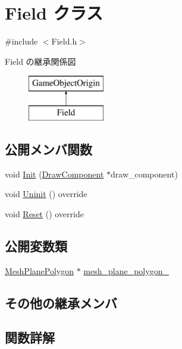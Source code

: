 \hypertarget{class_field}{}\section{Field クラス}
\label{class_field}


{\ttfamily \#include $<$Field.\+h$>$}

Field の継承関係図\begin{figure}[H]
\begin{center}
\leavevmode
\includegraphics[height=2.000000cm]{class_field}
\end{center}
\end{figure}
\subsection*{公開メンバ関数}
\begin{DoxyCompactItemize}
\item 
void \mbox{\hyperlink{class_field_a7d1f8e697d70550a416a595da78d07c7}{Init}} (\mbox{\hyperlink{class_draw_component}{Draw\+Component}} $\ast$draw\+\_\+component)
\item 
void \mbox{\hyperlink{class_field_a6d1015e2409daa87cd00485ac1efc06b}{Uninit}} () override
\item 
void \mbox{\hyperlink{class_field_a5b140074dcca821ac702da348238c6d4}{Reset}} () override
\end{DoxyCompactItemize}
\subsection*{公開変数類}
\begin{DoxyCompactItemize}
\item 
\mbox{\hyperlink{class_mesh_plane_polygon}{Mesh\+Plane\+Polygon}} $\ast$ \mbox{\hyperlink{class_field_a5c4ad4d2fea2269e7ab2185cf09beb10}{mesh\+\_\+plane\+\_\+polygon\+\_\+}}
\end{DoxyCompactItemize}
\subsection*{その他の継承メンバ}


\subsection{関数詳解}
\mbox{\label{class_field_a7d1f8e697d70550a416a595da78d07c7}} 
